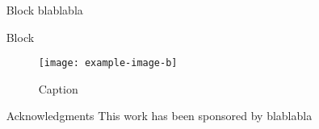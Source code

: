 \documentclass[final,hyperref={pdfpagelabels=false}]{beamer}
\begin{document}
\begin{frame}[t]
\begin{columns}[t]
\begin{column}{.465\textwidth}

    \end{column} %

    \begin{column}{.03\textwidth}\end{column} %

    \begin{column}{.465\textwidth} %


      \begin{block}{Block}
        blablabla
      \end{block}


      \begin{block}{Block}
        \begin{figure}
          \texttt{[image: example-image-b]}%
          \vspace{-7mm}
          \caption{Caption}
          \label{fig:simu}
        \end{figure}
      \end{block}



      \begin{block}{Acknowledgments}
        \footnotesize%
        \noindent This work has been sponsored by blablabla
      \end{block}



\end{column}
\end{columns}
\end{frame}
\end{document}
